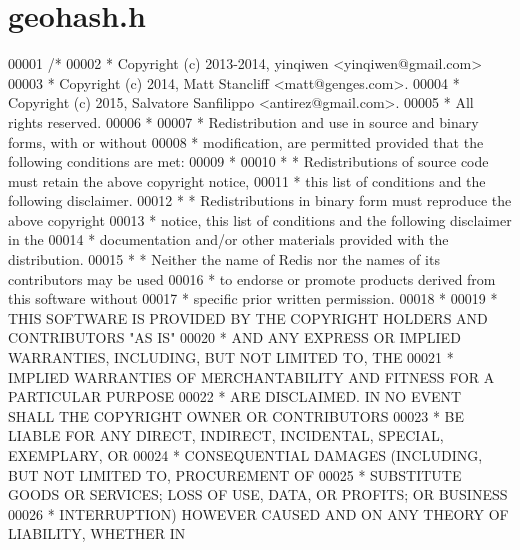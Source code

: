 \hypertarget{geohash_8h_source}{}\section{geohash.\+h}
\label{geohash_8h_source}

\begin{DoxyCode}
00001 \textcolor{comment}{/*}
00002 \textcolor{comment}{ * Copyright (c) 2013-2014, yinqiwen <yinqiwen@gmail.com>}
00003 \textcolor{comment}{ * Copyright (c) 2014, Matt Stancliff <matt@genges.com>.}
00004 \textcolor{comment}{ * Copyright (c) 2015, Salvatore Sanfilippo <antirez@gmail.com>.}
00005 \textcolor{comment}{ * All rights reserved.}
00006 \textcolor{comment}{ *}
00007 \textcolor{comment}{ * Redistribution and use in source and binary forms, with or without}
00008 \textcolor{comment}{ * modification, are permitted provided that the following conditions are met:}
00009 \textcolor{comment}{ *}
00010 \textcolor{comment}{ *  * Redistributions of source code must retain the above copyright notice,}
00011 \textcolor{comment}{ *    this list of conditions and the following disclaimer.}
00012 \textcolor{comment}{ *  * Redistributions in binary form must reproduce the above copyright}
00013 \textcolor{comment}{ *    notice, this list of conditions and the following disclaimer in the}
00014 \textcolor{comment}{ *    documentation and/or other materials provided with the distribution.}
00015 \textcolor{comment}{ *  * Neither the name of Redis nor the names of its contributors may be used}
00016 \textcolor{comment}{ *    to endorse or promote products derived from this software without}
00017 \textcolor{comment}{ *    specific prior written permission.}
00018 \textcolor{comment}{ *}
00019 \textcolor{comment}{ * THIS SOFTWARE IS PROVIDED BY THE COPYRIGHT HOLDERS AND CONTRIBUTORS "AS IS"}
00020 \textcolor{comment}{ * AND ANY EXPRESS OR IMPLIED WARRANTIES, INCLUDING, BUT NOT LIMITED TO, THE}
00021 \textcolor{comment}{ * IMPLIED WARRANTIES OF MERCHANTABILITY AND FITNESS FOR A PARTICULAR PURPOSE}
00022 \textcolor{comment}{ * ARE DISCLAIMED. IN NO EVENT SHALL THE COPYRIGHT OWNER OR CONTRIBUTORS}
00023 \textcolor{comment}{ * BE LIABLE FOR ANY DIRECT, INDIRECT, INCIDENTAL, SPECIAL, EXEMPLARY, OR}
00024 \textcolor{comment}{ * CONSEQUENTIAL DAMAGES (INCLUDING, BUT NOT LIMITED TO, PROCUREMENT OF}
00025 \textcolor{comment}{ * SUBSTITUTE GOODS OR SERVICES; LOSS OF USE, DATA, OR PROFITS; OR BUSINESS}
00026 \textcolor{comment}{ * INTERRUPTION) HOWEVER CAUSED AND ON ANY THEORY OF LIABILITY, WHETHER IN}

\end{DoxyCode}
